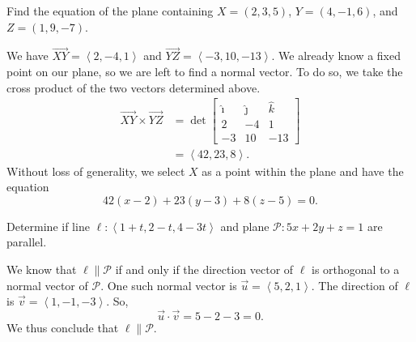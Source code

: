 \begin{example}
    Find the equation of the plane containing $X = (2, 3, 5)$, $Y = (4, -1, 6)$, and $Z = (1, 9, -7)$.

    \begin{soln}
        We have $\vec{XY} = \left<2, -4, 1\right>$ and $\vec{YZ} = \left<-3, 10, -13\right>$. We already know a fixed point on our plane, so we are left to find a normal vector. To do so, we take the cross product of the two vectors determined above.
        \begin{align*}
            \vec{XY} \times \vec{YZ} &= \det\begin{bmatrix}
                \hat{\imath} & \hat{\jmath} & \hat{k} \\
                2 & -4 & 1 \\
                -3 & 10 & -13
            \end{bmatrix} \\
            &= \left<42, 23, 8\right>.
        \end{align*}
        Without loss of generality, we select $X$ as a point within the plane and have the equation
        \[42(x - 2) + 23(y - 3) + 8(z - 5) = 0.\]
    \end{soln}
\end{example}

\begin{example}
    Determine if line $\ell : \left<1 + t, 2 - t, 4 - 3t\right>$ and plane $\mathcal{P} : 5x + 2y + z = 1$ are parallel.

    \begin{soln}
        We know that $\ell \parallel \mathcal{P}$ if and only if the direction vector of $\ell$ is orthogonal to a normal vector of $\mathcal{P}$. One such normal vector is $\vec{u} = \left<5, 2, 1\right>$. The direction of $\ell$ is $\vec{v} = \left<1, -1, -3\right>$. So,
        \[\vec{u} \cdot \vec{v} = 5 - 2 - 3 = 0.\]
        We thus conclude that $\ell \parallel \mathcal{P}$.
    \end{soln}
\end{example}